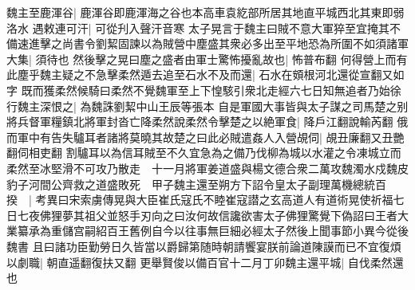 魏主至鹿渾谷|{
	鹿渾谷即鹿渾海之谷也本高車袁紇部所居其地直平城西北其東即弱洛水}
遇敕連可汗|{
	可從刋入聲汗音寒}
太子晃言于魏主曰賊不意大軍猝至宜掩其不備速進擊之尚書令劉絜固諫以為賊營中塵盛其衆必多出至平地恐為所圍不如須諸軍大集|{
	須待也}
然後擊之晃曰塵之盛者由軍士驚怖擾亂故也|{
	怖普布翻}
何得營上而有此塵乎魏主疑之不急擊柔然遁去追至石水不及而還|{
	石水在頞根河北還從宣翻又如字}
既而獲柔然候騎曰柔然不覺魏軍至上下惶駭引衆北走經六七日知無追者乃始徐行魏主深恨之|{
	為魏誅劉絜中山王辰等張本}
自是軍國大事皆與太子謀之司馬楚之别將兵督軍糧鎮北將軍封沓亡降柔然說柔然令擊楚之以絶軍食|{
	降戶江翻說輸芮翻}
俄而軍中有告失驢耳者諸將莫曉其故楚之曰此必賊遣姦人入營覘伺|{
	覘丑廉翻又丑艷翻伺相吏翻}
割驢耳以為信耳賊至不久宜急為之備乃伐柳為城以水灌之令凍城立而柔然至冰堅滑不可攻乃散走　十一月將軍姜道盛與楊文德合衆二萬攻魏濁水戍魏皮豹子河間公齊救之道盛敗死　甲子魏主還至朔方下詔令皇太子副理萬機總統百揆　|{
	考異曰宋索虜傳晃與大臣崔氏寇氏不睦崔寇譛之玄高道人有道術晃使祈福七日七夜佛狸夢其祖父並怒手刃向之曰汝何故信讒欲害太子佛狸驚覺下偽詔曰王者大業纂承為重儲宫嗣紹百王舊例自今以往事無巨細必經太子然後上聞事節小異今從後魏書}
且曰諸功臣勤勞日久皆當以爵歸第随時朝請饗宴朕前論道陳謨而已不宜復煩以劇職|{
	朝直遥翻復扶又翻}
更舉賢俊以備百官十二月丁卯魏主還平城|{
	自伐柔然還也}


